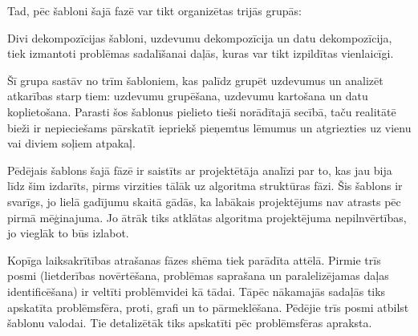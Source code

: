 Tad, pēc \cite{PatParProg} šabloni šajā fazē var tikt organizētas trijās grupās:
\begin{dotlist}
	\item {} Divi dekompozīcijas šabloni, uzdevumu dekompozīcija
		un datu dekompozīcija, tiek izmantoti problēmas sadalīšanai daļās, kuras
		var tikt izpildītas vienlaicīgi.
	\item {} Šī grupa sastāv no trīm šabloniem, kas palīdz grupēt
		uzdevumus un analizēt atkarības starp tiem: uzdevumu grupēšana, uzdevumu
		kartošana un datu koplietošana. Parasti šos šablonus pielieto tieši
		norādītajā secībā, taču realitātē bieži ir nepieciešams pārskatīt iepriekš
		pieņemtus lēmumus un atgriezties uz vienu vai diviem soļiem atpakaļ.
	\item {} Pēdējais šablons šajā fāzē ir saistīts
		ar projektētāja analīzi par to, kas jau bija līdz šim izdarīts, pirms
		virzities tālāk uz algoritma struktūras fāzi. Šis šablons ir svarīgs,
		jo lielā gadījumu skaitā gādās, ka labākais projektējums nav atrasts pēc
		pirmā mēģinajuma. Jo ātrāk tiks atklātas algoritma projektējuma nepilnvērtības,
		jo vieglāk to būs izlabot.
\end{dotlist}

Kopīga laiksakrītības atrašanas fāzes shēma tiek parādīta 
attēlā.
Pirmie trīs posmi (lietderības novērtēšana, problēmas saprašana un paralelizējamas
daļas identificēšana) ir veltīti problēmvidei kā tādai. Tāpēc nākamajās sadaļās
tiks apskatīta problēmsfēra, proti, grafi un to pārmeklēšana. Pēdējie trīs posmi atbilst
šablonu valodai. Tie detalizētāk tiks apskatīti pēc problēmsfēras apraksta.

